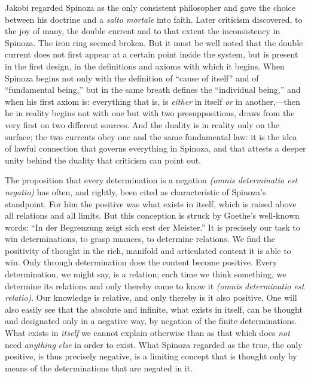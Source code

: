 \documentclass[12pt]{book}
\newcommand{\opage}[1]{\marginnote{\footnotesize\textit{[#1]}}}
\begin{document}
Jakobi regarded Spinoza as the only consistent philosopher and gave the choice between
his doctrine and a \textit{salto mortale} into faith. Later criticism discovered, to the
joy of many, the double current and to that extent the inconsistency in Spinoza. The
iron ring seemed broken. But it must be well noted that the double current does not
first appear at a certain point inside the system, but is present in the first design,
in the definitions and axioms with which it begins. When Spinoza begins not only with
the definition of ``cause of itself'' and of ``fundamental being,'' but in the same
breath defines the ``individual being,'' and when his first axiom is: everything that
is, is \emph{either} in itself \emph{or} in another,---then he in reality begins not
with one but with two presuppositions, draws from the very first on two different
sources. And the duality is in reality only on the surface; the two currents obey one
and the same fundamental law: it is the idea of lawful connection that governs
everything in Spinoza, and that attests a deeper unity behind the duality that
criticism can point out.

The proposition that every determination is a negation \textit{(omnis determinatio est
negatio)} has often, and rightly, been cited as characteristic of Spinoza's standpoint.
\opage{88}For him the positive was what exists in itself, which is raised above all
relations and all limits. But this conception is struck by Goethe's well-known words:
``In der Begrenzung zeigt sich erst der Meister.'' It is precisely our task to win
determinations, to grasp nuances, to determine relations. We find the positivity of
thought in the rich, manifold and articulated content it is able to win. Only through
determination does the content become positive. Every determination, we might say, is a
relation; each time we think something, we determine its relations and only thereby
come to know it \textit{(omnis determinatio est relatio)}. Our knowledge is relative,
and only thereby is it also positive. One will also easily see that the absolute and
infinite, what exists in itself, can be thought and designated only in a negative way,
by negation of the finite determinations. What exists in \emph{itself} we cannot explain
otherwise than as that which does \emph{not} need \emph{anything} \emph{else} in order
to exist. What Spinoza regarded as the true, the only positive, is thus precisely
negative, is a limiting concept that is thought only by means of the determinations
that are negated in it.
\end{document}
